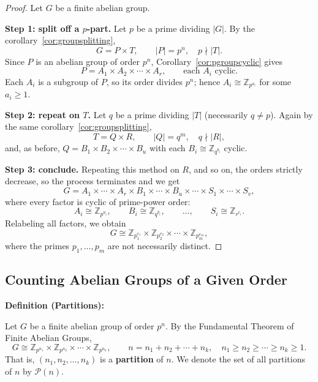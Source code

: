 \documentclass[11pt,a4paper]{article}
\newcommand{\Z}{\mathbb{Z}}
\newenvironment{definition}[1]{
	\begin{definitionbox}
		\textbf{\color{primaryColor}Definition (#1):} 
	}{
	\end{definitionbox}
}
\begin{document}
	\begin{proof}
		Let $G$ be a finite abelian group.
		
		\vspace{0.5em}
		\noindent \textbf{Step 1: split off a $p$-part.} Let $p$ be a prime dividing $|G|$. By the corollary~\ref{cor:groupsplitting},
		\[
		G = P \times T, \qquad |P| = p^n, \quad p \nmid |T|.
		\]
		Since $P$ is an abelian group of order $p^n$, Corollary~\ref{cor:pgroupcyclic} gives
		\[
		P = A_1 \times A_2 \times \cdots \times A_r, \qquad \text{each } A_i \text{ cyclic.}
		\]
		Each $A_i$ is a subgroup of $P$, so its order divides $p^n$; hence $A_i \cong \Z_{p^{a_i}}$ for some $a_i \ge 1$.
		
		\vspace{0.5em}
		\noindent \textbf{Step 2: repeat on $T$.} Let $q$ be a prime dividing $|T|$ (necessarily $q \neq p$). Again by the same corollary~\ref{cor:groupsplitting},
		\[
		T = Q \times R, \qquad |Q| = q^m, \quad q \nmid |R|,
		\]
		and, as before, $Q = B_1 \times B_2 \times \cdots \times B_u$ with each $B_i \cong \Z_{q^{b_i}}$ cyclic.
		
		\vspace{0.5em}
		\noindent \textbf{Step 3: conclude.} Repeating this method on $R$, and so on, the orders strictly decrease, so the process terminates and we get
		\[
		G = A_1 \times \cdots \times A_r \times B_1 \times \cdots \times B_u \times \cdots \times S_1 \times \cdots \times S_v,
		\]
		where every factor is cyclic of prime-power order:
		\[
		A_i \cong \Z_{p^{a_i}}, \qquad B_i \cong \Z_{q^{b_i}}, \qquad \dots, \qquad S_i \cong \Z_{r^{c_i}}.
		\]
		Relabeling all factors, we obtain
		\[
		G \cong \Z_{p_1^{e_1}} \times \Z_{p_2^{e_2}} \times \cdots \times \Z_{p_m^{e_m}},
		\]
		where the primes $p_1, \dots, p_m$ are not necessarily distinct. \qedhere
	\end{proof}
	
	
	\newpage
	\subsection{Counting Abelian Groups of a Given Order}
	
	\begin{definition}{Partitions}
		Let $G$ be a finite abelian group of order $p^n$. By the Fundamental Theorem of Finite Abelian Groups,
		\[
		G \cong \Z_{p^{n_1}} \times \Z_{p^{n_2}} \times \cdots \times \Z_{p^{n_k}}, \qquad n = n_1 + n_2 + \cdots + n_k, \quad n_1 \geq n_2 \geq \cdots \geq n_k \geq 1.
		\]
		That is, $(n_1, n_2, \dots, n_k)$ is a \textbf{partition} of $n$. We denote the set of all partitions of $n$ by $\mathcal{P}(n)$.
	\end{definition}
	
\end{document}
